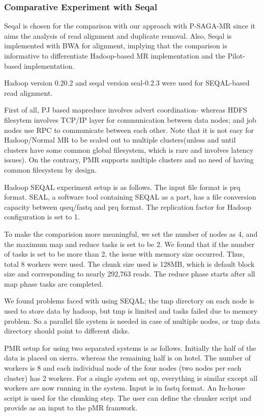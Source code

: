 \documentclass{sig-alternate}
\begin{document}
\subsubsection{Comparative Experiment with Seqal}
Seqal is chosen for the comparison with our approach with P-SAGA-MR since it aims the analysis of read alignment and duplicate removal.  Also, Seqal is implemented with BWA for alignment, implying that the comparison is informative to differentiate Hadoop-based MR implementation and the Pilot-based implementation.

Hadoop version 0.20.2 and seqal version  seal-0.2.3 were used for SEQAL-based read alignment.

First of all, PJ based mapreduce involves advert coordination- whereas HDFS filesytem involves TCP/IP layer for communication between data nodes; and job nodes use RPC to communicate between each other.
Note that it is not easy for Hadoop/Normal MR to be scaled out to multiple clusters(unless and until clusters have some common global filesystem, which is rare and involves latency issues).  On the contrary, PMR supports  multiple clusters and no need of having common filesystem by design.

Hadoop SEQAL experiment setup is as follows.  The input file format is prq format.  SEAL, a software tool containing SEQAL as a part, has a file conversion capacity between qseq/fastq and prq format.  The replication factor for Hadoop configuration is set  to 1.

To make the comparision more meaningful, we set the number of nodes as 4, and the maximum map and reduce tasks is set to be 2.  We found that if the number of tasks is set to be more than 2, the issue with memory size occurred.    Thus, total 8 workers were used.
The chunk size used is 128MB, which is default block size and corresponding to nearly 292,763 reads.
The reduce phase starts after all map phase tasks are completed. 

We found problems faced with using SEQAL; the tmp directory on each node is used to store data  by hadoop, but tmp is limited and tasks failed due to memory problem.  So a parallel file system is needed in case of multiple nodes, or tmp data directory should point to different disks.

PMR setup for using two separated systems is as follows.  Initially the half of the data is placed on sierra. whereas the remaining half is on hotel. The number of workers is 8 and each individual node of the four nodes (two nodes per each cluster) has 2 workers.  For a single system set up, everything is similar except all workers are now running in the system.  Input is in fastq format. An In-house script is used for the chunking step. The user can define the chunker script and provide as an input to the pMR framwork.  
 
\end{document}
